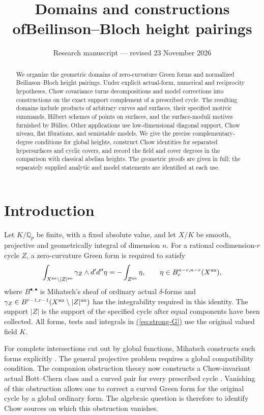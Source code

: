 \documentclass[11pt,a4paper]{article}
\title{Domains and constructions of\newline Beilinson--Bloch height pairings}
\author{}
\date{Research manuscript --- revised 23 November 2026}
\theoremstyle{definition}
\theoremstyle{remark}\newtheorem{remark}[theorem]{Remark}
\numberwithin{equation}{section}
\newcommand{\Q}{\mathbb Q}\newcommand{\R}{\mathbb R}\newcommand{\C}{\mathbb C}
\newcommand{\D}{d'd''}\newcommand{\ob}{\mathfrak o}
\renewcommand{\eqref}[1]{\hyperref[#1]{\textcolor{equationlink}{(\ref*{#1})}}}
\begin{document}
\maketitle
\begin{abstract}
We organize the geometric domains of zero-curvature Green forms and normalized
Beilinson--Bloch height pairings. Under explicit actual-form, numerical
and reciprocity hypotheses, Chow covariance turns decompositions and model
corrections into constructions on the exact support complement of a prescribed
cycle. The resulting domains include products of arbitrary curves and
surfaces, their specified motivic summands, Hilbert schemes of points on
surfaces, and the surface-moduli motives furnished by B\"ulles. Other
applications use low-dimensional diagonal support, Chow niveau, flat
fibrations, and semistable models. We give the precise complementary-degree
conditions for global heights, construct Chow identities for separated
hypersurfaces and cyclic covers, and record the field and cover degrees in
the comparison with classical abelian heights. The geometric proofs are given
in full; the separately supplied analytic and model statements are identified
at each use.
\end{abstract}
\tableofcontents

\section{Introduction}\label{sec:intro}

Let $K/\Q_p$ be finite, with a fixed absolute value, and let $X/K$ be smooth,
projective and geometrically integral of dimension $n$. For a rational
codimension-$r$ cycle $Z$, a zero-curvature Green form is required to satisfy
\begin{equation}\label{eq:strong-G}
 \int_{X^{\an}\setminus |Z|^{\an}}\gamma_Z\wedge\D\eta
       =-\int_{Z^{\an}}\eta,
 \qquad \eta\in B_c^{n-r,n-r}(X^{\an}),
\end{equation}
where $B^{\bullet,\bullet}$ is Mihatsch's sheaf of ordinary actual
$\delta$-forms and
$\gamma_Z\in B^{r-1,r-1}(X^{\mathrm{an}}\setminus |Z|^{\mathrm{an}})$ has the
integrability required in this identity. The support $|Z|$ is the support of
the specified cycle after equal components have been collected. All forms,
tests and integrals in \eqref{eq:strong-G} use the original valued field $K$.

For complete intersections cut out by global functions, Mihatsch constructs
such forms explicitly \cite[Theorem 5.5]{Mihatsch}. The general projective
problem requires a global compatibility condition. The companion obstruction
theory now constructs a Chow-invariant actual Bott--Chern class and a curved
pair for every prescribed cycle \cite[Theorem 1.1]{ChowGreenPairs}. Vanishing of this obstruction
allows one to correct a curved Green form for the original cycle by a global
ordinary form. The algebraic question is therefore to identify Chow sources
on which this obstruction vanishes.
\end{document}
